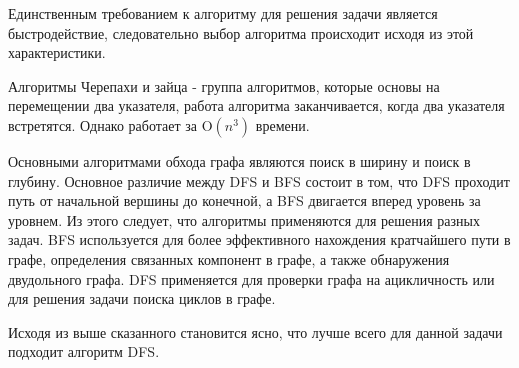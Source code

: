 Единственным требованием к алгоритму для решения задачи является быстродействие, следовательно выбор алгоритма происходит исходя из этой характеристики.

Алгоритмы Черепахи и зайца - группа алгоритмов, которые основы на перемещении два указателя, работа алгоритма заканчивается, когда два указателя встретятся. Однако работает за O$(n^3)$ времени.

Основными алгоритмами обхода графа являются поиск в ширину  и поиск в глубину. Основное различие между DFS и BFS состоит в том, что DFS проходит путь от начальной вершины до конечной, а BFS двигается вперед уровень за уровнем. Из этого следует, что алгоритмы применяются для решения разных задач. BFS используется для более эффективного нахождения кратчайшего пути в графе, определения связанных компонент в графе, а также обнаружения двудольного графа. DFS применяется для проверки графа на ацикличность или для решения задачи поиска циклов в графе.

Исходя из выше сказанного становится ясно, что лучше всего для данной задачи подходит алгоритм DFS.